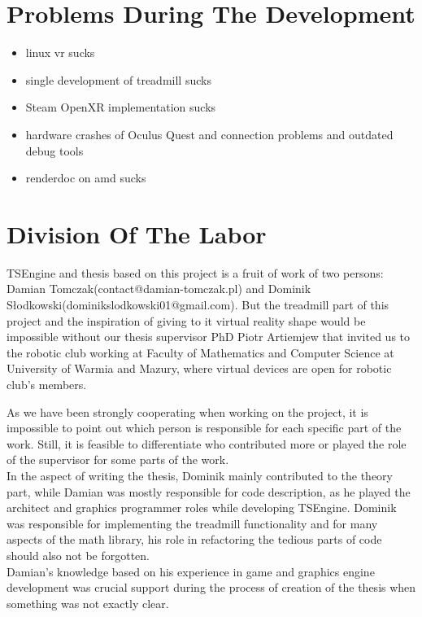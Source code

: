 \newpage
\section{Problems During The Development}
\label{sec:problems}
\hspace{\parindent}
\begin{itemize}
    \item linux vr sucks
    \item single development of treadmill sucks
    \item Steam OpenXR implementation sucks
    \item hardware crashes of Oculus Quest and connection problems and outdated debug tools
    \item renderdoc on amd sucks
\end{itemize}
\newpage
\section{Division Of The Labor}
\label{sec:labor}
\hspace{\parindent}
TSEngine and thesis based on this project is a fruit of work of two persons: Damian Tomczak(contact@damian-tomczak.pl) and Dominik Słodkowski(dominikslodkowski01@gmail.com).
But the treadmill part of this project and the inspiration of giving to it virtual reality shape would be impossible without our thesis supervisor PhD Piotr Artiemjew that invited us to the robotic club working at Faculty of Mathematics and Computer Science at University of Warmia and Mazury, where virtual devices are open for robotic club's members.

As we have been strongly cooperating when working on the project, it is impossible to point out which person is responsible for each specific part of the work. Still, it is feasible to differentiate who contributed more or played the role of the supervisor for some parts of the work.\\
In the aspect of writing the thesis, Dominik mainly contributed to the theory part, while Damian was mostly responsible for code description, as he played the architect and graphics programmer roles while developing TSEngine. Dominik was responsible for implementing the treadmill functionality and for many aspects of the math library, his role in refactoring the tedious parts of code should also not be forgotten.\\ Damian's knowledge based on his experience in game and graphics engine development was crucial support during the process of creation of the thesis when something was not exactly clear.  

